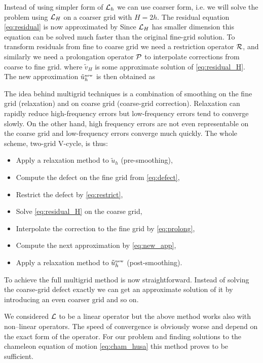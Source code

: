 Instead of using simpler form of $\mathcal{L}_h$ we can use coarser form, i.e. we will solve the problem using $\mathcal{L}_H$ on a coarser grid with $H=2h$. The residual equation \eqref{eq:residual} is now approximated by
Since $\mathcal{L}_H$ has smaller dimension this equation can be solved much faster than the original fine-grid solution. To transform residuals from fine to coarse grid we need a restriction operator $\mathcal{R}$, and similarly we need a  prolongation operator $\mathcal{P}$ to interpolate corrections from coarse to fine grid.
where $\tilde v_H$ is some approximate solution of \eqref{eq:residual_H}. The new approximation $\tilde u_h^\text{\tiny new}$ is then obtained as

The idea behind multigrid techniques is a combination of smoothing on the fine grid (relaxation) and on coarse grid (coarse-grid correction). Relaxation can rapidly reduce high-frequency errors but low-frequency errors tend to converge slowly. On the other hand, high frequency errors are not even representable on the coarse grid and low-frequency errors converge much quickly. The whole scheme, two-grid V-cycle, is thus:
\begin{itemize}
    \item Apply a relaxation method to $\tilde u_h$ (pre-smoothing),
    \item Compute the defect on the fine grid from \eqref{eq:defect},
    \item Restrict the defect by \eqref{eq:restrict},
    \item Solve \eqref{eq:residual_H} on the coarse grid,
    \item Interpolate the correction to the fine grid by \eqref{eq:prolong},
    \item Compute the next approximation by \eqref{eq:new_app},
    \item Apply a relaxation method to $\tilde u_h^\text{\tiny new}$ (post-smoothing).
\end{itemize}
To achieve the full multigrid method is now straightforward. Instead of solving the coarse-grid defect exactly we can get an approximate solution of it by introducing an even coarser grid and so on.

We considered $\mathcal{L}$ to be a linear operator but the above method works also with non--linear operators. The speed of convergence is obviously worse and depend on the exact form of the operator. For our problem and finding solutions to the chameleon equation of motion \eqref{eq:cham_husa} this method proves to be sufficient.

